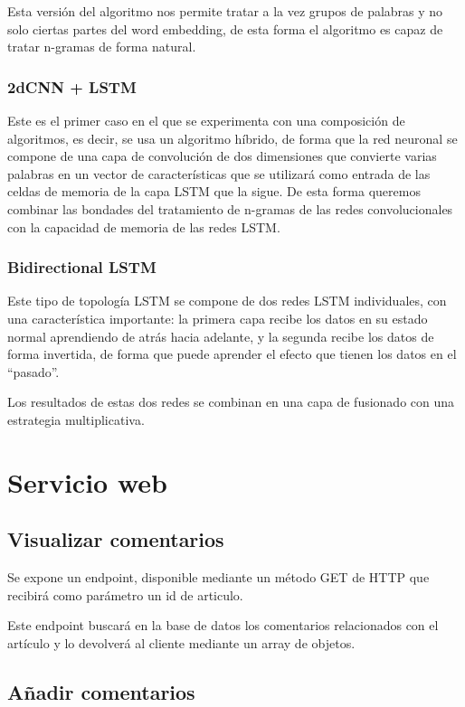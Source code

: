 Esta versión del algoritmo nos permite tratar a la vez grupos de palabras y no solo ciertas partes del word embedding, de esta forma el algoritmo es capaz de tratar n-gramas de forma natural.

\subsubsection{2dCNN + LSTM}

Este es el primer caso en el que se experimenta con una composición de algoritmos, es decir, se usa un algoritmo híbrido, de forma que la red neuronal se compone de una capa de convolución de dos dimensiones que convierte varias palabras en un vector de características que se utilizará como entrada de las celdas de memoria de la capa LSTM que la sigue. De esta forma queremos combinar las bondades del tratamiento de n-gramas de las redes convolucionales con la capacidad de memoria de las redes LSTM.

\subsubsection{Bidirectional LSTM}\label{bidi}

Este tipo de topología LSTM se compone de dos redes LSTM individuales, con una característica importante: la primera capa recibe los datos en su estado normal aprendiendo de atrás hacia adelante, y la segunda recibe los datos de forma invertida, de forma que puede aprender el efecto que tienen los datos en el ``pasado''.

Los resultados de estas dos redes se combinan en una capa de fusionado con una estrategia multiplicativa.

\section{Servicio web}


\subsection{Visualizar comentarios}

Se expone un endpoint, disponible mediante un método GET de HTTP que recibirá como parámetro un id de articulo.

Este endpoint buscará en la base de datos los comentarios relacionados con el artículo y lo devolverá al cliente mediante un array de objetos.

\subsection{Añadir comentarios}

